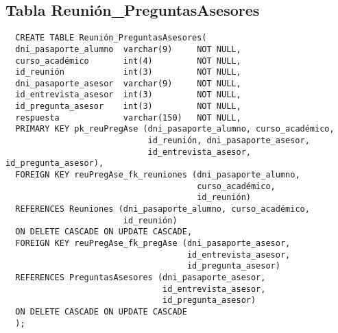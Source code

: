 \subsection{Tabla Reunión\_PreguntasAsesores}

\begin{verbatim}
  CREATE TABLE Reunión_PreguntasAsesores(
  dni_pasaporte_alumno  varchar(9)     NOT NULL,
  curso_académico       int(4)         NOT NULL,
  id_reunión            int(3)         NOT NULL,
  dni_pasaporte_asesor  varchar(9)     NOT NULL,
  id_entrevista_asesor  int(3)         NOT NULL,
  id_pregunta_asesor    int(3)         NOT NULL,
  respuesta             varchar(150)   NOT NULL,
  PRIMARY KEY pk_reuPregAse (dni_pasaporte_alumno, curso_académico,
                             id_reunión, dni_pasaporte_asesor,
                             id_entrevista_asesor, id_pregunta_asesor),
  FOREIGN KEY reuPregAse_fk_reuniones (dni_pasaporte_alumno,
                                       curso_académico,
                                       id_reunión)
  REFERENCES Reuniones (dni_pasaporte_alumno, curso_académico,
                        id_reunión)
  ON DELETE CASCADE ON UPDATE CASCADE,
  FOREIGN KEY reuPregAse_fk_pregAse (dni_pasaporte_asesor,
                                     id_entrevista_asesor,
                                     id_pregunta_asesor)
  REFERENCES PreguntasAsesores (dni_pasaporte_asesor,
                                id_entrevista_asesor,
                                id_pregunta_asesor)
  ON DELETE CASCADE ON UPDATE CASCADE
  );
\end{verbatim}
